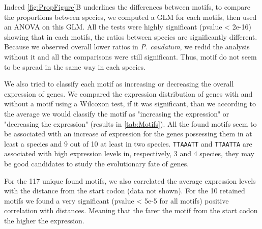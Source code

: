 Indeed \autoref{fig:PropFigure}B underlines the differences between motifs, to compare the proportions between species, we computed a GLM for each motifs, then used an ANOVA on this GLM. All the tests were highly significant (pvalue < 2e-16) showing that in each motifs, the ratios between species are significantly different. Because we observed overall lower ratios in \textit{P. caudatum}, we redid the analysis without it and all the comparisons were still significant. Thus, motif do not seem to be spread in the same way in each species.

We also tried to classify each motif as increasing or decreasing the overall expression of genes. We compared the expression distribution of genes with and without a motif using a Wilcoxon test, if it was significant, than we according to the average we would classify the motif as "increasing the expression" or "decreasing the expression" (results in \autoref{tab:Motifs}). All the found motifs seem to be associated with an increase of expression for the genes possessing them in at least a species and 9 out of 10 at least in two species. \texttt{TTAAATT} and \texttt{TTAATTA} are associated with high expression levels in, respectively, 3 and 4 species, they may be good candidates to study the evolutionary fate of genes.

For the 117 unique found motifs, we also correlated the average expression levels with the distance from the start codon (data not shown). For the 10 retained motifs we found a very significant (pvalue < 5e-5 for all motifs) positive correlation with distances. Meaning that the farer the motif from the start codon the higher the expression.